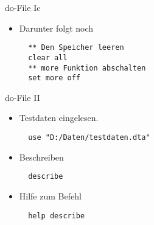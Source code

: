 \begin{frame}[fragile]{do-File Ic}
\begin{itemize}
  \item Darunter folgt noch
  
  \begin{lstlisting}
  ** Den Speicher leeren
  clear all
  ** more Funktion abschalten
  set more off
  \end{lstlisting}
  \end{itemize}
      

\end{frame}


\begin{frame}[fragile]{do-File II}
 \begin{itemize}
  \item Testdaten eingelesen.  

  \begin{lstlisting}
  use "D:/Daten/testdaten.dta"
  \end{lstlisting}

  \item Beschreiben 
  
  \begin{lstlisting}
  describe
  \end{lstlisting}
 
  \item Hilfe zum Befehl 
  \begin{lstlisting}
  help describe
  \end{lstlisting}

 \end{itemize}
\end{frame}

